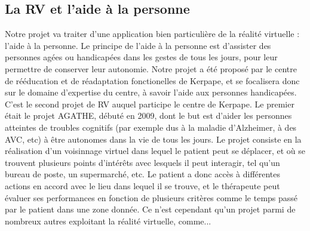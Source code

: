 \subsection{La RV et l'aide à la personne}
Notre projet va traiter d'une application bien particulière de la réalité virtuelle : l'aide à la personne. Le principe de l'aide à la personne est d'assister des personnes agées ou handicapées dans les gestes de tous les jours, pour leur permettre de conserver leur autonomie. Notre projet a été proposé par le centre de rééducation et de réadaptation fonctionelles de Kerpape, et se focalisera donc sur le domaine d'expertise du centre, à savoir l'aide aux personnes handicapées. \\

C'est le second projet de RV auquel participe le centre de Kerpape. Le premier était le projet AGATHE, débuté en 2009, dont le but est d'aider les personnes atteintes de troubles cognitifs (par exemple dus à la maladie d'Alzheimer, à des AVC, etc) à être autonomes dans la vie de tous les jours. Le projet consiste en la réalisation d'un \og voisinnage virtuel \fg{} dans lequel le patient peut se déplacer, et où se trouvent plusieurs points d'intérêts avec lesquels il peut interagir, tel qu'un bureau de poste, un supermarché, etc. Le patient a donc accès à différentes actions en accord avec le lieu dans lequel il se trouve, et le thérapeute peut évaluer ses performances en fonction de plusieurs critères comme le temps passé par le patient dans une zone donnée. 
Ce n'est cependant qu'un projet parmi de nombreux autres exploitant la réalité virtuelle, comme...